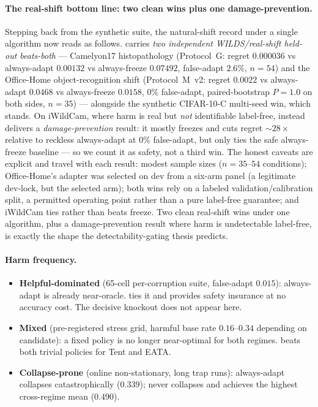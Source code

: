 \paragraph{The real-shift bottom line: two clean wins plus one damage-prevention.}
Stepping back from the synthetic suite, the natural-shift record under a single
algorithm now reads as follows.  \KGA{} carries \emph{two independent
WILDS/real-shift held-out beats-both} --- Camelyon17 histopathology (Protocol~G:
regret $0.000036$ vs always-adapt $0.00132$ vs always-freeze $0.07492$, false-adapt
$2.6\%$, $n{=}54$) and the Office-Home object-recognition shift (Protocol~M~v2:
regret $0.0022$ vs always-adapt $0.0468$ vs always-freeze $0.0158$, $0\%$
false-adapt, paired-bootstrap $P{=}1.0$ on both sides, $n{=}35$) --- alongside the
synthetic CIFAR-10-C multi-seed win, which stands.  On iWildCam, where harm is real
but \emph{not} identifiable label-free, \KGA{} instead delivers a
\emph{damage-prevention} result: it mostly freezes and cuts regret ${\sim}28{\times}$
relative to reckless always-adapt at $0\%$ false-adapt, but only ties the safe
always-freeze baseline --- so we count it as safety, not a third win.  The honest
caveats are explicit and travel with each result: modest sample sizes ($n{=}35$--$54$
conditions); Office-Home's adapter was selected on dev from a six-arm panel (a
legitimate dev-lock, but the selected arm); both wins rely on a labeled
validation/calibration split, a permitted operating point rather than a pure
label-free guarantee; and iWildCam ties rather than beats freeze.  Two clean
real-shift wins under one algorithm, plus a damage-prevention result where harm is
undetectable label-free, is exactly the shape the detectability-gating thesis
predicts.

\paragraph{Harm frequency.}
\begin{itemize}
\item \textbf{Helpful-dominated} (65-cell per-corruption suite, false-adapt $0.015$):
  always-adapt is already near-oracle.  \KGA{} ties it and provides safety insurance
  at no accuracy cost.  The decisive knockout does not appear here.
\item \textbf{Mixed} (pre-registered stress grid, harmful base rate $0.16$--$0.34$
  depending on candidate): a fixed policy is no longer near-optimal for both regimes.
  \KGA{} beats both trivial policies for Tent and EATA.
\item \textbf{Collapse-prone} (online non-stationary, long trap runs): always-adapt
  collapses catastrophically ($0.339$); \KGA{} never collapses and achieves the
  highest cross-regime mean ($0.490$).
\end{itemize}

